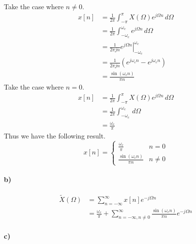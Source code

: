 \documentclass[12pt]{article}
\begin{document}
Take the case where \(n\neq 0\).
\begin{align*}
    x[n] &= \frac{1}{2\pi}\int_{-\pi}^\pi X(\Omega) e^{j\Omega n}\,d\Omega\\
    &=\frac{1}{2\pi}\int_{-\omega_c}^{\omega_c} e^{j\Omega n}\,d\Omega\\
    &=\frac{1}{2\pi jn}\left.e^{j\Omega n}\right|_{-\omega_c}^{\omega_c}\\
    &=\frac{1}{2\pi jn}(e^{j\omega_c n}-e^{j\omega_c n})\\
    &=\frac{\sin(\omega_c n)}{\pi n}
\end{align*}
Take the case where \(n=0\).
\begin{align*}
    x[n] &= \frac{1}{2\pi}\int_{-\pi}^\pi X(\Omega) e^{j\Omega n}\,d\Omega\\
    &=\frac{1}{2\pi}\int_{-\omega_c}^{\omega_c}\,d\Omega\\
    &=\frac{\omega_c}{\pi}
\end{align*}
Thus we have the following result.
\[x[n]=\begin{cases}\frac{\omega_c}{\pi}&n=0\\ \frac{\sin(\omega_c n)}{\pi n}& n\neq 0\end{cases}\]

\paragraph{b)}

\begin{align*}
    \tilde{X}(\Omega) &= \sum_{n=-\infty}^\infty x[n] e^{-j\Omega n}\\
    &= \frac{\omega_c}{\pi} + \sum_{n=-\infty, n\neq 0}^\infty \frac{\sin(\omega_c n)}{\pi n} e^{-j\Omega n}
\end{align*}

\paragraph{c)}
\end{document}
